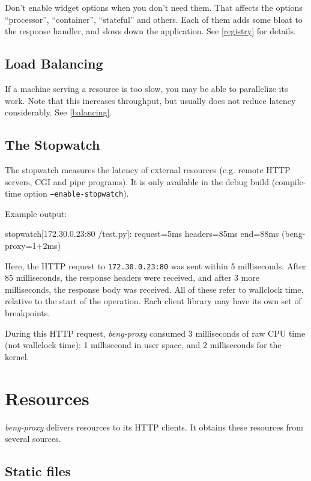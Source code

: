\documentclass[a4paper,12pt]{article}
\begin{document}
Don't enable widget options when you don't need them.  That affects
the options ``processor'', ``container'', ``stateful'' and others.
Each of them adds some bloat to the response handler, and slows down
the application.  See \ref{registry} for details.

\subsection{Load Balancing}

If a machine serving a resource is too slow, you may be able to
parallelize its work.  Note that this increases throughput, but
usually does not reduce latency considerably.  See \ref{balancing}.

\subsection{The Stopwatch}
\label{stopwatch}

The stopwatch measures the latency of external resources (e.g. remote
HTTP servers, CGI and pipe programs).  It is only available in the
debug build (compile-time option \texttt{--enable-stopwatch}).

Example output:

\begin{verbatim*}
stopwatch[172.30.0.23:80 /test.py]: request=5ms headers=85ms
end=88ms (beng-proxy=1+2ms)
\end{verbatim*}

Here, the HTTP request to \texttt{172.30.0.23:80} was sent within 5
milliseconds.  After 85 milliseconds, the response headers were
received, and after 3 more milliseconds, the response body was
received.  All of these refer to wallclock time, relative to the start
of the operation.  Each client library may have its own set of
breakpoints.

During this HTTP request, \emph{beng-proxy} consumed 3 milliseconds of
raw CPU time (not wallclock time): 1 millisecond in user space, and 2
milliseconds for the kernel.

\section{Resources}

\emph{beng-proxy} delivers resources to its HTTP clients.  It obtains
these resources from several sources.

\subsection{Static files}
\label{static}
\end{document}
